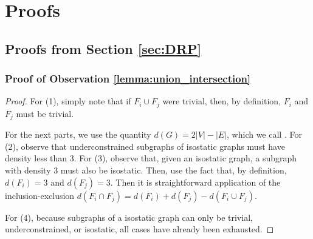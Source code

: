 \section{Proofs}
\label{sec:appendix:a}
\label{sec:appendix:proofs}

\subsection{Proofs from Section \ref{sec:DRP}}









\subsubsection{Proof of Observation \ref{lemma:union_intersection}}

\begin{proof}
For (1), simply note that if $F_i\cup F_j$ were trivial, then, by definition, $F_i$ and $F_j$ must be trivial.

For the next parts, we use the quantity $d(G)=2|V|-|E|$, which we call .
For (2), observe that underconstrained subgraphs of isostatic graphs must have density less than 3.
For (3), observe that, given an isostatic graph, a subgraph with density $3$ must also be isostatic. Then, use the fact that, by definition, $d(F_i)=3$ and $d(F_j)=3$. Then it is straightforward application of the inclusion-exclusion $d(F_i\cap F_j)=d(F_i)+d(F_j)-d(F_i\cup F_j)$.

For (4), because subgraphs of a isostatic graph can only be trivial, underconstrained, or isostatic, all cases have already been exhausted.
\end{proof}




